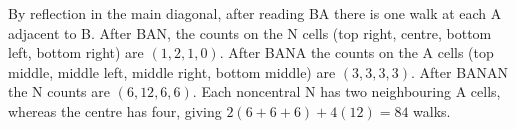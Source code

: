 By reflection in the main diagonal, after reading BA there is one walk at each A adjacent to B. After BAN, the counts on the N cells (top right, centre, bottom left, bottom right) are $(1,2,1,0)$. After BANA the counts on the A cells (top middle, middle left, middle right, bottom middle) are $(3,3,3,3)$. After BANAN the N counts are $(6,12,6,6)$. Each noncentral N has two neighbouring A cells, whereas the centre has four, giving $2(6+6+6)+4(12)=\boxed{84}$ walks.
